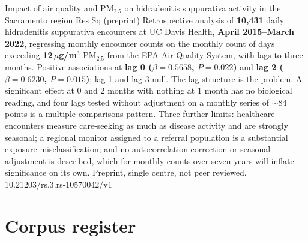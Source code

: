 \documentclass[10pt]{article}
\begin{document}

{Impact of air quality and PM$_{2.5}$ on hidradenitis suppurativa activity in the
Sacramento region}
{Res Sq (preprint)}
{Retrospective analysis of \textbf{10,431} daily hidradenitis suppurativa encounters at UC
Davis Health, \textbf{April 2015--March 2022}, regressing monthly encounter counts on the
monthly count of days exceeding \textbf{12\,$\mu$g/m$^3$} PM$_{2.5}$ from the EPA Air
Quality System, with lags to three months. Positive associations at
\textbf{lag 0 ($\beta=0.5658$, $P=0.022$)} and \textbf{lag 2 ($\beta=0.6230$,
$P=0.015$)}; lag 1 and lag 3 null. The lag structure is the problem. A significant effect
at 0 and 2 months with nothing at 1 month has no biological reading, and four lags tested
without adjustment on a monthly series of $\sim$84 points is a multiple-comparisons
pattern. Three further limits: healthcare encounters measure care-seeking as much as
disease activity and are strongly seasonal; a regional monitor assigned to a referral
population is a substantial exposure misclassification; and no autocorrelation correction
or seasonal adjustment is described, which for monthly counts over seven years will
inflate significance on its own. Preprint, single centre, not peer reviewed.}
{10.21203/rs.3.rs-10570042/v1}

\clearpage

\section*{\sffamily\bfseries\color{Deep}Corpus register}
\vspace{-1.5mm}{\color{Amber}\rule{\linewidth}{1.1pt}}\vspace{2.5mm}


\end{document}
